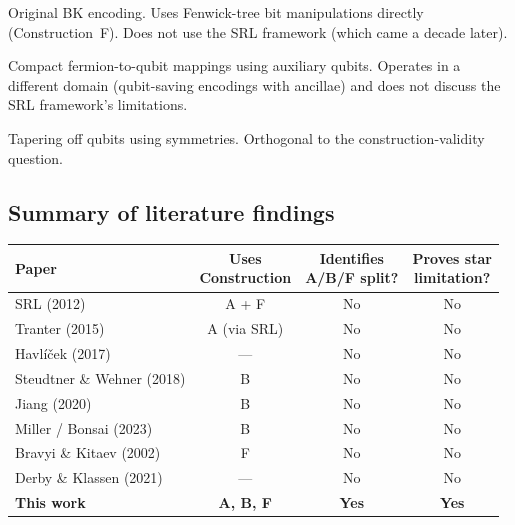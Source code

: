 \documentclass[11pt,a4paper]{article}
\theoremstyle{definition}
\begin{document}
\begin{description}[leftmargin=1.5cm]
  \item[Bravyi \& Kitaev (2002)~\cite{bravyi2002}.]
    Original BK encoding.  Uses Fenwick-tree bit manipulations directly
    (Construction~F).  Does not use the SRL framework (which came a
    decade later).

  \item[Derby \& Klassen (2021)~\cite{derby2021}.]
    Compact fermion-to-qubit mappings using auxiliary qubits.  Operates
    in a different domain (qubit-saving encodings with ancillae) and
    does not discuss the SRL framework's limitations.

  \item[Bravyi et al.\ (2017)~\cite{bravyi2017tapering}.]
    Tapering off qubits using symmetries.  Orthogonal to the
    construction-validity question.
\end{description}

\subsection{Summary of literature findings}

\begin{center}
\begin{tabular}{@{}p{4cm}ccc@{}}
\toprule
Paper & \parbox{2cm}{\centering Uses\\Construction} &
  \parbox{2.2cm}{\centering Identifies\\A/B/F split?} &
  \parbox{2.2cm}{\centering Proves star\\limitation?} \\
\midrule
SRL (2012) & A + F & No & No \\
Tranter (2015) & A (via SRL) & No & No \\
Havl\'{i}\v{c}ek (2017) & --- & No & No \\
Steudtner \& Wehner (2018) & B & No & No \\
Jiang (2020) & B & No & No \\
Miller / Bonsai (2023) & B & No & No \\
Bravyi \& Kitaev (2002) & F & No & No \\
Derby \& Klassen (2021) & --- & No & No \\
\midrule
\textbf{This work} & \textbf{A, B, F} & \textbf{Yes} & \textbf{Yes} \\
\bottomrule
\end{tabular}
\end{center}
\end{document}
